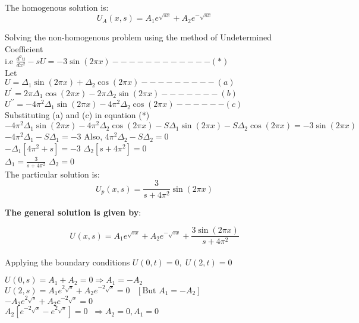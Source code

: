 \documentclass[a4paper 11pt]{article}
\newcommand{\sbracket}[1]{\left[#1\right]}
\newcommand{\Un}[2]{U_{#1}(#2)}
\newcommand{\NI}{\noindent}
\newcommand{\Dtl}[1]{\Delta_{#1}}
\begin{document}
\NI The homogenous solution is: \\[0.2cm]
$$\Un{A}{x,s} = A_{1}e^{\sqrt{sx}} + A_{2}e^{-\sqrt{sx}}$$

\NI Solving the non-homogenous problem using the method of Undetermined Coefficient \\[0.2cm]
i.e ${\displaystyle \frac{d^{2}u}{dx^{2}} - sU = - 3\sin(2\pi x) - - - - - - - - - - - - (*)}$ \\[0.2cm]
Let \\ ${\displaystyle U = \Delta_{1}\sin(2\pi x) + \Delta_{2}\cos(2\pi x) - - - - - - - - - (a)}$ \\[0.2cm]
 ${\displaystyle U^{\prime} = 2\pi \Delta_{1}\cos(2\pi x) - 2\pi \Delta_{2}\sin(2\pi x)  - - - - - - - (b)}$ \\[0.2cm]
 ${\displaystyle U^{\prime\prime} = -4\pi^{2} \Delta_{1}\sin(2\pi x) - 4\pi^2\Delta_2\cos(2\pi x)  - - - - - - (c)}$ \\[0.2cm]

\NI Substituting (a) and (c) in equation (*) \\[0.2cm]
$-4\pi^{2}\Dtl{1}\sin(2\pi x) - 4\pi^{2}\Dtl{2}\cos(2\pi x) - S\Dtl{1}\sin(2\pi x) - S\Dtl{2}\cos(2\pi x) = -3\sin(2\pi x)$ \\[0.2cm]
$-4\pi^{2}\Dtl{1} - S\Dtl{1} = - 3$  \quad \quad \quad Also, $4\pi^{2}\Dtl{2} - S\Dtl{2} = 0$ \\[0.2cm]
$-\Dtl{1}\sbracket{4\pi^{2} + s} = - 3 $ \quad \quad \quad \quad \quad \quad $\Dtl{2}\sbracket{s + 4\pi^{2}} = 0$ \\[0.2cm]
$\Dtl{1} = \displaystyle \frac{3}{s + 4\pi^{2}} $ \quad \quad \quad \quad \quad \quad \quad  \quad \quad $\Dtl{2} = 0$ \\[0.2cm]

\NI The particular solution is:\\
$$\Un{p}{x,s} = \frac{3}{s + 4\pi^{2}}\sin(2\pi x) $$

\NI  \textbf{The general solution is given by}:

$$\Un{}{x,s} = A_{1}e^{\sqrt{sx}} + A_{2}e^{-\sqrt{sx}} + \frac{3\sin(2\pi x)}{s + 4\pi^{2}}$$ \\[0.5cm]

\NI Applying the boundary conditions $\Un{}{0,t} = 0, \; \Un{}{2,t} = 0$

\NI $\displaystyle \Un{}{0,s} = A_1 + A_2 = 0 \Rightarrow A_1 = - A_2$\\[0.2cm]
\NI $\displaystyle \Un{}{2,s} = A_{1}e^{2\sqrt{s}} + A_{2}e^{-2\sqrt{s}} = 0 \; \; \; \sbracket{\text{But } A_1 = - A_2}$\\[0.2cm]
$\displaystyle - A_2e^{2\sqrt{s}} + A_2e^{-2\sqrt{s}} = 0$\\[0.2cm]
$\displaystyle A_{2}\sbracket{e^{-2\sqrt{s}} - e^{2\sqrt{s}}} = 0 \; \; \Rightarrow A_2 = 0, A_1 = 0$\\[0.2cm]
\end{document}
